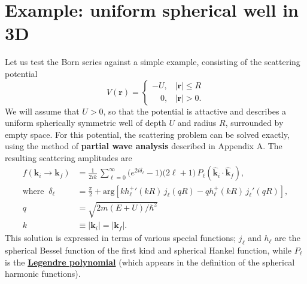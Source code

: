 \documentclass[pra,12pt]{revtex4}
\begin{document}
\section{Example: uniform spherical well in 3D}

Let us test the Born series against a simple example, consisting of
the scattering potential
\begin{equation}
  V(\mathbf{r}) = \begin{cases}-U, & |\mathbf{r}| \le R \\ \;\;\;\,0,
    & |\mathbf{r}| > 0. \end{cases}
\end{equation}
We will assume that $U > 0$, so that the potential is attactive and
describes a uniform spherically symmetric well of depth $U$ and radius
$R$, surrounded by empty space.  For this potential, the scattering
problem can be solved exactly, using the method of \textbf{partial
  wave analysis} described in Appendix A.  The resulting scattering
amplitudes are
\begin{equation}
  \begin{aligned}f(\mathbf{k}_i \rightarrow \mathbf{k}_f) &= \frac{1}{2ik}\, \sum_{\ell =0}^\infty \big(e^{2i\delta_\ell} - 1\big) \big(2\ell+1\big)\, P_{\ell}(\hat{\mathbf{k}}_i\cdot \hat{\mathbf{k}}_f), \\ \mathrm{where}\;\; \delta_\ell &= \frac{\pi}{2} + \mathrm{arg}\!\left[k {h_\ell^+}'(kR) \, j_\ell(qR) - qh_\ell^+(kR)\, j_\ell'(qR)\right], \\ q &= \sqrt{2m(E+U)/\hbar^2} \\ k &\equiv |\mathbf{k}_i| = |\mathbf{k}_f|.\end{aligned}
\end{equation}
This solution is expressed in terms of various special functions;
$j_\ell$ and $h_\ell$ are the spherical Bessel function of the first
kind and spherical Hankel function, while $P_\ell$ is the
\href{https://en.wikipedia.org/wiki/Legendre_polynomials}{\textbf{Legendre
    polynomial}} (which appears in the definition of the spherical
harmonic functions).
\end{document}
